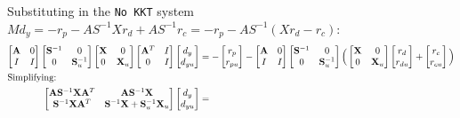 \documentclass[10pt,a4paper]{article}
\begin{document}
Substituting in the \texttt{No KKT} system $Md_y = -r_p - AS^{-1}Xr_d + AS^{-1}r_c = -r_p -  AS^{-1}(Xr_d - r_c)$:
\begin{align*}
\begin{bmatrix}\mathbf{A} & 0 \\ I & I\end{bmatrix}
\begin{bmatrix}\mathbf{S}^{-1} & 0 \\ 0 & \mathbf{S}_u^{-1}\end{bmatrix}
\begin{bmatrix}\mathbf{X} & 0 \\ 0 & \mathbf{X}_u\end{bmatrix}
\begin{bmatrix}\mathbf{A}^T & I \\ 0 & I\end{bmatrix}
\begin{bmatrix}d_y \\ d_{yu}\end{bmatrix} &=
-\begin{bmatrix}r_p \\ r_{pu}\end{bmatrix}
- \begin{bmatrix}\mathbf{A} & 0 \\ I & I\end{bmatrix}
\begin{bmatrix}\mathbf{S}^{-1} & 0 \\ 0 & \mathbf{S}_u^{-1}\end{bmatrix}
\Big(
	\begin{bmatrix}\mathbf{X} & 0 \\ 0 & \mathbf{X}_u\end{bmatrix}
	\begin{bmatrix}r_d \\ r_{du}\end{bmatrix}
	+ \begin{bmatrix}r_c \\ r_{cu}\end{bmatrix}
\Big) \\
\intertext{Simplifying:}
\begin{bmatrix}
	\mathbf{A}\mathbf{S}^{-1}\mathbf{X}\mathbf{A}^T & \mathbf{A}\mathbf{S}^{-1}\mathbf{X} \\
	\mathbf{S}^{-1}\mathbf{X}\mathbf{A}^T & \mathbf{S}^{-1}\mathbf{X}+\mathbf{S}_u^{-1}\mathbf{X}_u
\end{bmatrix}
\begin{bmatrix}d_y \\ d_{yu}\end{bmatrix} &=

\end{align*}
\end{document}
